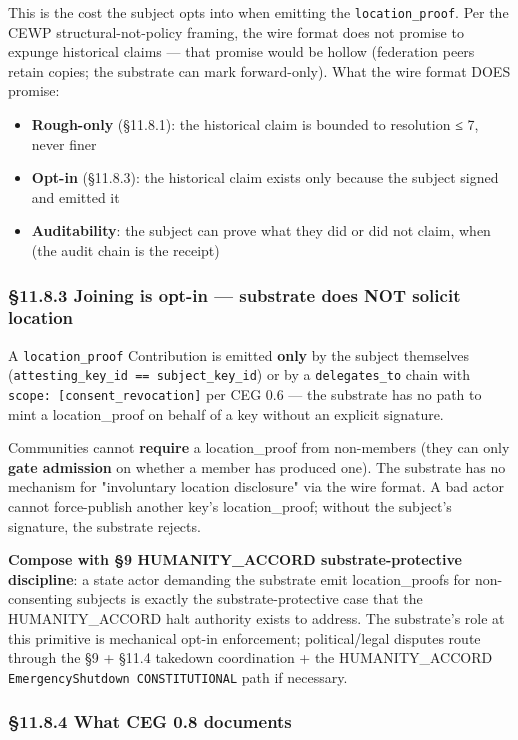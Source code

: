 \documentclass[11pt]{article}
\begin{document}
This is the cost the subject opts into when emitting the \texttt{location\_proof}. Per the CEWP structural-not-policy framing, the wire format does not promise to expunge historical claims — that promise would be hollow (federation peers retain copies; the substrate can mark forward-only). What the wire format DOES promise:


\begin{itemize}\setlength\itemsep{0pt}
\item \textbf{Rough-only} (§11.8.1): the historical claim is bounded to resolution ≤ 7, never finer
\item \textbf{Opt-in} (§11.8.3): the historical claim exists only because the subject signed and emitted it
\item \textbf{Auditability}: the subject can prove what they did or did not claim, when (the audit chain is the receipt)
\end{itemize}


\subsubsection*{§11.8.3 Joining is opt-in — substrate does NOT solicit location}


A \texttt{location\_proof} Contribution is emitted \textbf{only} by the subject themselves (\texttt{attesting\_key\_id == subject\_key\_id}) or by a \texttt{delegates\_to} chain with \texttt{scope: [consent\_revocation]} per CEG 0.6 — the substrate has no path to mint a location\_proof on behalf of a key without an explicit signature.


Communities cannot \textbf{require} a location\_proof from non-members (they can only \textbf{gate admission} on whether a member has produced one). The substrate has no mechanism for "involuntary location disclosure" via the wire format. A bad actor cannot force-publish another key's location\_proof; without the subject's signature, the substrate rejects.


\textbf{Compose with §9 HUMANITY\_ACCORD substrate-protective discipline}: a state actor demanding the substrate emit location\_proofs for non-consenting subjects is exactly the substrate-protective case that the HUMANITY\_ACCORD halt authority exists to address. The substrate's role at this primitive is mechanical opt-in enforcement; political/legal disputes route through the §9 + §11.4 takedown coordination + the HUMANITY\_ACCORD \texttt{EmergencyShutdown CONSTITUTIONAL} path if necessary.


\subsubsection*{§11.8.4 What CEG 0.8 documents}
\end{document}
